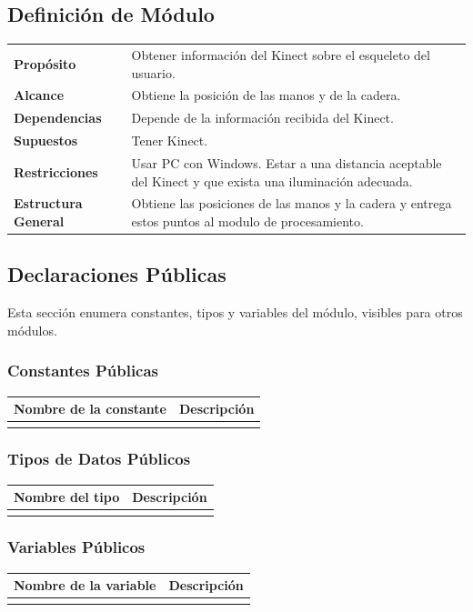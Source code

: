\documentclass[a4paper,10pt]{article}
\begin{document}
\subsection{Definición de Módulo}
\begin{tabularx}{\textwidth}{p{25mm} X}
        \textbf{Propósito} & Obtener información del Kinect sobre el esqueleto del usuario.\\
        \textbf{Alcance} & Obtiene la posición de las manos y de la cadera.\\
        \textbf{Dependencias} & Depende de la información recibida del Kinect.\\
        \textbf{Supuestos} & Tener Kinect. \\
        \textbf{Restricciones} & Usar PC con Windows. Estar a una distancia aceptable del Kinect y que exista una iluminación adecuada.\\
        \textbf{Estructura General} & Obtiene las posiciones de las manos y la cadera y entrega estos puntos al modulo de procesamiento.\\
\end{tabularx}
\subsection{Declaraciones Públicas}
Esta sección enumera constantes, tipos y variables del módulo, visibles para
otros módulos.
\subsubsection{Constantes Públicas}
\begin{tabular}{| p{30mm} | p{10cm} |}
        \hline
        \textbf{Nombre de la \mbox{constante}} & \textbf{Descripción} \\
        \hline
         & \\
        \hline
\end{tabular}
                

\subsubsection{Tipos de Datos Públicos}
\begin{tabular}{| p{30mm} | p{10cm} |}
        \hline
        \textbf{Nombre del \mbox{tipo}} & \textbf{Descripción} \\
        \hline
         & \\
        \hline
\end{tabular}
\subsubsection{Variables Públicos}
\begin{tabular}{| p{30mm} | p{10cm} |}
        \hline
        \textbf{Nombre de la \mbox{variable}} & \textbf{Descripción} \\
        \hline
         & \\
        \hline
\end{tabular}
\end{document}
